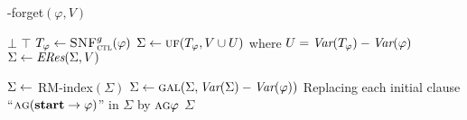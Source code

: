 \begin{algorithm}[tb]
	\caption{{\CTL-forget}$(\varphi, V)$}
	\label{alg:compute:forgetting:by:Resolution}
	\LinesNumbered
	\lIf{$\varphi\equiv\bot$} {{\bf \Return $\bot$}}    
	 {{\bf \Return  $\top$}}   
	$T_\varphi \leftarrow {\textsc{SNF}_{\textsc{ctl}}^g}(\varphi)$ 
	$\Sigma\leftarrow \textsc{uf}(T_\varphi,V\cup U)$ where $U=\textit{Var}(T_\varphi)-\textit{Var}(\varphi)$
	$\Sigma\leftarrow \emph{ERes}(\Sigma,V)$ 
	
	$\Sigma\leftarrow$ {RM-index}$(\Sigma)$ 
	$\Sigma\leftarrow \textsc{gal}(\Sigma,\textit{Var}(\Sigma)-\textit{Var}(\varphi))$ 
	Replacing each initial clause ``$\textsc{a}\textsc{g}(\textbf{start}\rightarrow\varphi)$'' in $\Sigma$ by $\textsc{a}\textsc{g}\varphi$\;
	\Return $\Sigma$\;
\end{algorithm}



